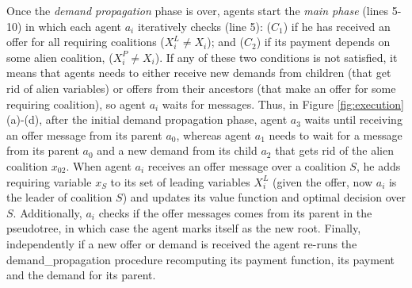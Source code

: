 \documentclass[11pt, twoside, titlepage, a4paper, openright]{report}
\begin{document}
Once the \emph{demand propagation} phase is over, agents start the \emph{main
phase} (lines 5-10) in which each agent $a_i$ iteratively checks (line 5):
($C_1$) if he has received an offer for all requiring coalitions ($X^{L}_i\neq
X_i$); and ($C_2$) if its payment depends on some alien coalition, ($X^{P}_i\neq
X_i$).
If any of these two conditions is not satisfied, it means that agents needs to
either receive new demands from children (that get rid of alien variables) or
offers from their ancestors (that make an offer for some requiring
coalition), so agent $a_i$ waits for messages. 
Thus, in Figure \ref{fig:execution}(a)-(d), after the initial demand propagation
phase, agent $a_3$ waits until receiving an offer message from its parent
$a_0$, whereas agent $a_1$ needs to wait for a message from its parent $a_0$ and
a new demand from its child $a_2$ that gets rid of the alien coalition $x_{02}$.
When agent $a_i$ receives an offer message over a coalition
$S$, he adds requiring variable $x_S$ to its set of leading variables $X^{L}_i$
(given the offer, now $a_i$ is the leader of coalition $S$) and updates its
value function and optimal decision over $S$.
Additionally, $a_i$ checks if the offer messages comes from its parent in
the pseudotree, in which case the agent marks itself as the new root.
Finally, independently if a new offer or demand is received the
agent re-runs the demand\_propagation procedure recomputing its payment
function, its payment and the demand for its parent.
\end{document}
